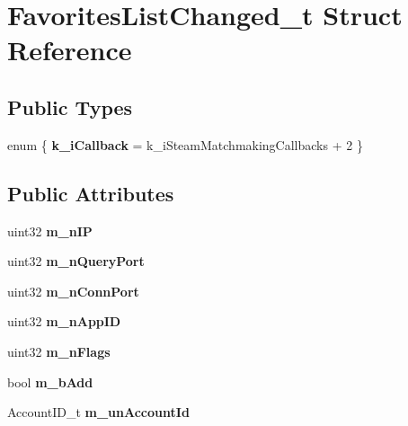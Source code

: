 \hypertarget{structFavoritesListChanged__t}{}\section{Favorites\+List\+Changed\+\_\+t Struct Reference}
\label{structFavoritesListChanged__t}
\subsection*{Public Types}
\begin{DoxyCompactItemize}
\item 
\hypertarget{structFavoritesListChanged__t_a8e4c1394f1e1ea38b9a8c439b761114a}{}enum \{ {\bfseries k\+\_\+i\+Callback} = k\+\_\+i\+Steam\+Matchmaking\+Callbacks + 2
 \}\label{structFavoritesListChanged__t_a8e4c1394f1e1ea38b9a8c439b761114a}

\end{DoxyCompactItemize}
\subsection*{Public Attributes}
\begin{DoxyCompactItemize}
\item 
\hypertarget{structFavoritesListChanged__t_a6633b739e7f8362052c270f8a7c39735}{}uint32 {\bfseries m\+\_\+n\+I\+P}\label{structFavoritesListChanged__t_a6633b739e7f8362052c270f8a7c39735}

\item 
\hypertarget{structFavoritesListChanged__t_ab4c3b208cc5723b3ce21ba67df58f820}{}uint32 {\bfseries m\+\_\+n\+Query\+Port}\label{structFavoritesListChanged__t_ab4c3b208cc5723b3ce21ba67df58f820}

\item 
\hypertarget{structFavoritesListChanged__t_a823733cc68b43103a4de9a683281c45a}{}uint32 {\bfseries m\+\_\+n\+Conn\+Port}\label{structFavoritesListChanged__t_a823733cc68b43103a4de9a683281c45a}

\item 
\hypertarget{structFavoritesListChanged__t_a40e8e04d52a690119dde9e5b5ef9d8f8}{}uint32 {\bfseries m\+\_\+n\+App\+I\+D}\label{structFavoritesListChanged__t_a40e8e04d52a690119dde9e5b5ef9d8f8}

\item 
\hypertarget{structFavoritesListChanged__t_a8e3a7634a9f0f1a39ba2bf87b635f278}{}uint32 {\bfseries m\+\_\+n\+Flags}\label{structFavoritesListChanged__t_a8e3a7634a9f0f1a39ba2bf87b635f278}

\item 
\hypertarget{structFavoritesListChanged__t_aff8f37b36436aa74f853a216413027d1}{}bool {\bfseries m\+\_\+b\+Add}\label{structFavoritesListChanged__t_aff8f37b36436aa74f853a216413027d1}

\item 
\hypertarget{structFavoritesListChanged__t_a6a03a273d2d0c6c6e340a6c56b9c6ca3}{}Account\+I\+D\+\_\+t {\bfseries m\+\_\+un\+Account\+Id}\label{structFavoritesListChanged__t_a6a03a273d2d0c6c6e340a6c56b9c6ca3}

\end{DoxyCompactItemize}


